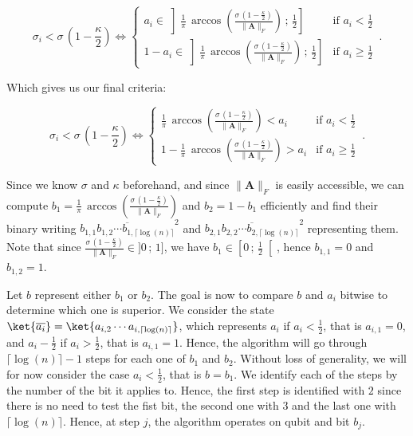 \documentclass[11pt, a4paper]{article}
\begin{document}
            \[\sigma_i < \sigma\,\left(1 - \frac\kappa2\right)\iff\begin{cases}a_i\in\left]\frac1\pi\,\arccos\left(\frac{\sigma\,\left(1 - \frac\kappa2\right)}{\|\mathbf{A}\|_F}\right)\,;\,\frac12\right]&\text{if }a_i<\frac12\\1-a_i\in\left]\frac1\pi\,\arccos\left(\frac{\sigma\,\left(1 - \frac\kappa2\right)}{\|\mathbf{A}\|_F}\right)\,;\,\frac12\right]&\text{if }a_i\geqslant\frac12\end{cases}\,.\]
            
            Which gives us our final criteria:
            
            \[\sigma_i < \sigma\,\left(1 - \frac\kappa2\right)\iff\begin{cases}\frac1\pi\,\arccos\left(\frac{\sigma\,\left(1 - \frac\kappa2\right)}{\|\mathbf{A}\|_F}\right) < a_i&\text{if }a_i<\frac12\\1-\frac1\pi\,\arccos\left(\frac{\sigma\,\left(1 - \frac\kappa2\right)}{\|\mathbf{A}\|_F}\right) > a_i&\text{if }a_i\geqslant\frac12\end{cases}\,.\]
                        
            Since we know \(\sigma\) and \(\kappa\) beforehand, and since \(\|\mathbf{A}\|_F\) is easily accessible, we can compute \(b_1=\frac1\pi\,\arccos\left(\frac{\sigma\,\left(1 - \frac\kappa2\right)}{\|\mathbf{A}\|_F}\right)\) and \(b_2 = 1 - b_1\) efficiently and find their binary writing \(\overline{b_{1,1}b_{1, 2}\cdots b_{1,\lceil\log(n)\rceil}}^2\) and \(\overline{b_{2,1}b_{2, 2}\cdots b_{2,\lceil\log(n)\rceil}}^2\) representing them. Note that since \(\frac{\sigma\,\left(1 - \frac\kappa2\right)}{\|\mathbf{A}\|_F}\in]0\,;\,1]\), we have \(b_1\in\left[0\,;\,\frac12\right[\), hence \(b_{1,1}=0\) and \(b_{1,2}=1\).
            
            Let \(b\) represent either \(b_1\) or \(b_2\). The goal is now to compare \(b\) and \(a_i\) bitwise to determine which one is superior. We consider the state \(\ket{\overline{a_i}} = \ket{a_{i,2}\cdots a_{i,\lceil\log(n)\rceil}}\), which represents \(a_i\) if \(a_i<\frac12\), that is \(a_{i,1}=0\), and \(a_i-\frac12\) if \(a_i>\frac12\), that is \(a_{i, 1} = 1\). Hence, the algorithm will go through \(\lceil\log(n)\rceil - 1\) steps for each one of \(b_1\) and \(b_2\). Without loss of generality, we will for now consider the case \(a_i<\frac12\), that is \(b=b_1\). We identify each of the steps by the number of the bit it applies to. Hence, the first step is identified with \(2\) since there is no need to test the fist bit, the second one with \(3\) and the last one with \(\lceil\log(n)\rceil\). Hence, at step \(j\), the algorithm operates on qubit  and bit \(b_j\).
            
\end{document}
